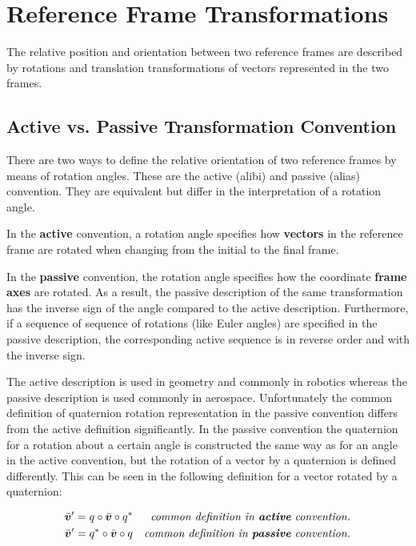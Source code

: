 \documentclass[a4paper]{paper}
\begin{document}
\section{Reference Frame Transformations}

The relative position and orientation between two reference frames are described by rotations and translation transformations of vectors represented in the two frames.

\subsection{Active vs. Passive Transformation Convention}
\label{sec:actvie_vs_passive}

There are two ways to define the relative orientation of two reference frames by means of rotation angles.
These are the active (alibi) and passive (alias) convention.
They are equivalent but differ in the interpretation of a rotation angle.

In the \textbf{active} convention, a rotation angle specifies how \textbf{vectors} in the reference frame are rotated when changing from the initial to the final frame.

In the \textbf{passive} convention, the rotation angle specifies how the coordinate \textbf{frame axes} are rotated. As a result, the passive description of the same transformation has the inverse sign of the angle compared to the active description. Furthermore, if a sequence of sequence of rotations (like Euler angles) are specified in the passive description, the corresponding active sequence is in reverse order and with the inverse sign.

The active description is used in geometry and commonly in robotics whereas the passive description is used commonly in aerospace.
Unfortunately the common definition of quaternion rotation representation in the passive convention differs from the active definition significantly.
In the passive convention the quaternion for a rotation about a certain angle is constructed the same way as for an angle in the active convention, but the rotation of a vector by a quaternion is defined differently. This can be seen in the following definition for a vector rotated by a quaternion:

\begin{align}
    \bar{\bm{v}}' = q \circ \bar{\bm{v}} \circ q^* && \textit{common definition in \textbf{active} convention.}\\
    \bar{\bm{v}}' = q^* \circ \bar{\bm{v}} \circ q && \textit{common definition in \textbf{passive} convention.}
\end{align}
\end{document}
